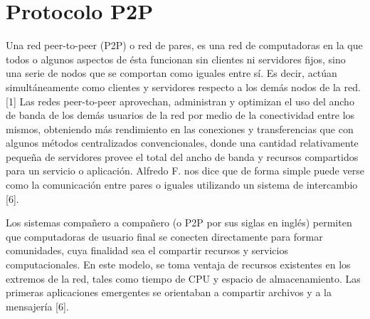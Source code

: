 
\chapter{Protocolo P2P} %

\label{ch:protocolo_p2p} %


Una red peer-to-peer (P2P) o red de pares, es una red de computadoras en la que todos o algunos aspectos de ésta funcionan sin clientes ni servidores fijos, sino una serie de nodos que se comportan como iguales entre sí. Es decir, actúan simultáneamente como clientes y servidores respecto a los demás nodos de la red.[1]
Las redes peer-to-peer aprovechan, administran y optimizan el uso del ancho de banda de los demás usuarios de la red por medio de la conectividad entre los mismos, obteniendo más rendimiento en las conexiones y transferencias que con algunos métodos centralizados convencionales, donde una cantidad relativamente pequeña de servidores provee el total del ancho de banda y recursos compartidos para un servicio o aplicación.
Alfredo F. nos dice que de forma simple puede verse como la comunicación entre pares o iguales utilizando un sistema de intercambio [6].

Los sistemas compañero a compañero (o P2P por sus siglas en inglés) permiten que computadoras de usuario final se conecten directamente para formar comunidades, cuya finalidad sea el compartir recursos y servicios computacionales. En este modelo, se toma ventaja de recursos existentes en los extremos de la red, tales como tiempo de CPU y espacio de almacenamiento. Las primeras aplicaciones  emergentes se orientaban a compartir archivos y a la mensajería [6].



